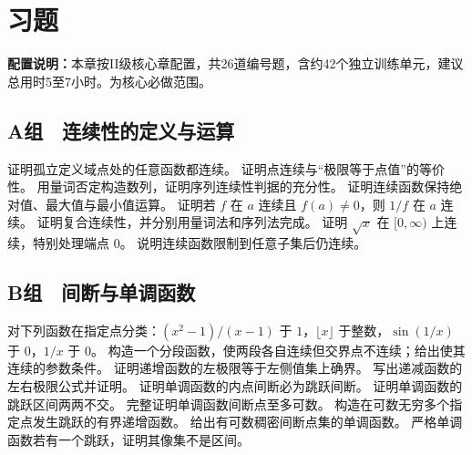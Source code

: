 \section*{习题}

\noindent\textbf{配置说明：}本章按II级核心章配置，共26道编号题，含约42个独立训练单元，建议总用时5至7小时。为核心必做范围。

\subsection*{A组　连续性的定义与运算}
\begin{enumerate}[label=\textbf{17.\arabic*.}]
  \mustdo 证明孤立定义域点处的任意函数都连续。
  \mustdo 证明点连续与“极限等于点值”的等价性。
  \mustdo 用量词否定构造数列，证明序列连续性判据的充分性。
  \mustdo 证明连续函数保持绝对值、最大值与最小值运算。
  \mustdo 证明若 \(f\) 在 \(a\) 连续且 \(f(a)\ne0\)，则 \(1/f\) 在 \(a\) 连续。
  \mustdo 证明复合连续性，并分别用量词法和序列法完成。
  \mustdo 证明 \(\sqrt x\) 在 \([0,\infty)\) 上连续，特别处理端点 \(0\)。
  \mustdo 说明连续函数限制到任意子集后仍连续。
\end{enumerate}

\subsection*{B组　间断与单调函数}
\begin{enumerate}[label=\textbf{17.\arabic*.},resume]
  \mustdo 对下列函数在指定点分类：\((x^2-1)/(x-1)\) 于 \(1\)，\(\lfloor x\rfloor\) 于整数，\(\sin(1/x)\) 于 \(0\)，\(1/x\) 于 \(0\)。
  \mustdo 构造一个分段函数，使两段各自连续但交界点不连续；给出使其连续的参数条件。
  \mustdo 证明递增函数的左极限等于左侧值集上确界。
  \mustdo 写出递减函数的左右极限公式并证明。
  \mustdo 证明单调函数的内点间断必为跳跃间断。
  \mustdo 证明单调函数的跳跃区间两两不交。
  \mustdo 完整证明单调函数间断点至多可数。
  \mustdo 构造在可数无穷多个指定点发生跳跃的有界递增函数。
  \mustdo 给出有可数稠密间断点集的单调函数。
  \mustdo 严格单调函数若有一个跳跃，证明其像集不是区间。
\end{enumerate}

